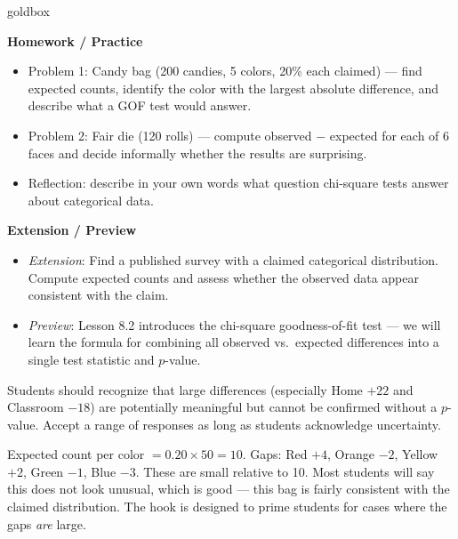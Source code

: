 \documentclass[10pt]{article}
\begin{document}
\begin{skillbox}{goldbox}
\begin{minipage}[t]{0.48\linewidth}
    \textbf{Homework / Practice}
    \begin{itemize}
        \item Problem 1: Candy bag (200 candies, 5 colors, 20\% each claimed) ---
              find expected counts, identify the color with the largest absolute
              difference, and describe what a GOF test would answer.
        \item Problem 2: Fair die (120 rolls) --- compute observed $-$ expected
              for each of 6 faces and decide informally whether the results
              are surprising.
        \item Reflection: describe in your own words what question chi-square
              tests answer about categorical data.
    \end{itemize}
\end{minipage}
\hfill
\begin{minipage}[t]{0.48\linewidth}
    \textbf{Extension / Preview}
    \begin{itemize}
        \item \textit{Extension}: Find a published survey with a claimed categorical
              distribution. Compute expected counts and assess whether the observed
              data appear consistent with the claim.
        \item \textit{Preview}: Lesson 8.2 introduces the chi-square goodness-of-fit
              test --- we will learn the formula for combining all observed vs.\
              expected differences into a single test statistic and $p$-value.
    \end{itemize}
\end{minipage}
\end{skillbox}


\begin{teachernote}
    Students should recognize that large differences (especially Home $+22$ and
    Classroom $-18$) are potentially meaningful but cannot be confirmed without a
    $p$-value. Accept a range of responses as long as students acknowledge uncertainty.
\end{teachernote}

\begin{teachernote}
    Expected count per color $= 0.20 \times 50 = 10$. Gaps: Red $+4$, Orange $-2$,
    Yellow $+2$, Green $-1$, Blue $-3$. These are small relative to 10.
    Most students will say this does not look unusual, which is good --- this bag
    is fairly consistent with the claimed distribution. The hook is designed to
    prime students for cases where the gaps \emph{are} large.
\end{teachernote}
\end{document}
